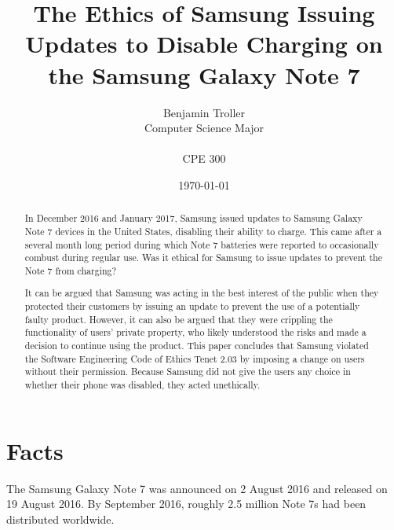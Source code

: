 \documentclass[12pt]{article}
\begin{document}
\sloppy

\begin{titlepage}
\title{The Ethics of Samsung Issuing Updates to Disable Charging on the Samsung Galaxy Note 7}

\author{Benjamin Troller \\ Computer Science Major \\ \\ CPE 300}
\date{\today}

\clearpage\maketitle

\begin{abstract}
   In December 2016 and January 2017, Samsung issued updates to Samsung Galaxy Note 7 devices in the United States, disabling their ability to charge. This came after a several month long period during which Note 7 batteries were reported to occasionally combust during regular use. Was it ethical for Samsung to issue updates to prevent the Note 7 from charging?
   
   It can be argued that Samsung was acting in the best interest of the public when they protected their customers by issuing an update to prevent the use of a potentially faulty product. However, it can also be argued that they were crippling the functionality of users' private property, who likely understood the risks and made a decision to continue using the product. %
   This paper concludes that Samsung violated the Software Engineering Code of Ethics Tenet 2.03 by imposing a change on users without their permission. Because Samsung did not give the users any choice in whether their phone was disabled, they acted unethically.
\end{abstract}

\thispagestyle{empty}
\end{titlepage}

\tableofcontents
\pagebreak

\twocolumn

\section{Facts}


   The Samsung Galaxy Note 7 was announced on 2 August 2016 and released on 19 August 2016. By September 2016, roughly 2.5 million Note 7s had been distributed worldwide\cite{jamesVincentVerge}.
   
\end{document}
